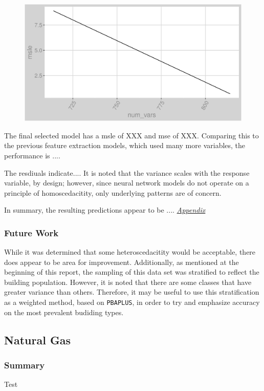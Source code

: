 \begin{figure}[h]
\centering
\includegraphics[width=\textwidth, height=0.4\textheight]{Images/electricity_nn_error.png}
\end{figure}

The final selected model has a msle of XXX and mse of XXX.  Comparing this to the previous feature extraction models, which used many more variables, the performance is ....

The resdiuals indicate.... It is noted that the variance scales with the response variable, by design; however, since neural network models do not operate on a principle of homoscedacitity, only underlying patterns are of concern.  

In summary, the resulting predictions appear to be ....  \textit{\hyperref[appendix:electricity:nn_full]{Appendix}}

\subsubsection{Future Work}
While it was determined that some heteroscedacitity would be acceptable, there does appear to be area for improvement.  Additionally, as mentioned at the beginning of this report, the sampling of this data set was stratified to reflect the building population.  However, it is noted that there are some classes that have greater variance than others.  Therefore, it may be useful to use this stratification as a weighted method, based on \lstinline{PBAPLUS}, in order to try and emphasize accuracy on the most prevalent budiding types. 

\subsection{Natural Gas}

\subsubsection{Summary}
Test

